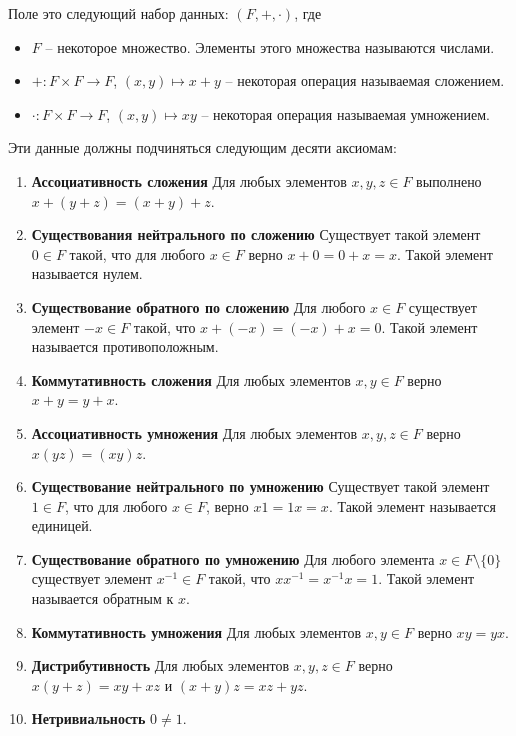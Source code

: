 \begin{definition}
[Поле]
Поле это следующий набор данных: $(F, + , \cdot)$, где
\begin{itemize}
\item $F$ -- некоторое множество.
Элементы этого множества называются числами.

\item $+\colon F\times F\to F$, $(x,y)\mapsto x+y$ -- некоторая операция называемая сложением.

\item $\cdot\colon F\times F\to F$, $(x,y)\mapsto xy$ -- некоторая операция называемая умножением.
\end{itemize}
Эти данные должны подчиняться следующим десяти аксиомам:
\begin{enumerate}
\item {\bf Ассоциативность сложения}
Для любых элементов $x,y,z\in F$ выполнено $x+(y+z) = (x+y)+z$.

\item {\bf Существования нейтрального по сложению}
Существует такой элемент $0\in F$ такой, что для любого $x\in F$ верно $x + 0 = 0 + x = x$.
Такой элемент называется нулем.

\item {\bf Существование обратного по сложению}
Для любого $x\in F$ существует элемент $-x\in F$ такой, что $x + (-x) = (-x) + x = 0$.
Такой элемент называется противоположным.

\item {\bf Коммутативность сложения}
Для любых элементов $x,y\in F$ верно $x+y = y+x$.

\item {\bf Ассоциативность умножения}
Для любых элементов $x,y,z\in F$ верно $x(yz) = (xy)z$.

\item {\bf Существование нейтрального по умножению}
Существует такой элемент $1\in F$, что для любого $x\in F$, верно $x 1 = 1 x = x$.
Такой элемент называется единицей.

\item {\bf Существование обратного по умножению}
Для любого элемента $x\in F\setminus\{0\}$ существует элемент $x^{-1}\in F$ такой, что $x x^{-1} = x^{-1}x = 1$.
Такой элемент называется обратным к $x$.

\item {\bf Коммутативность умножения}
Для любых элементов $x,y\in F$ верно $xy = yx$.

\item {\bf Дистрибутивность}
Для любых элементов $x,y,z\in F$ верно $x(y+z) = xy + xz$ и $(x+y)z = xz + yz$.

\item {\bf Нетривиальность}
$0\neq 1$.
\end{enumerate}
\end{definition}

